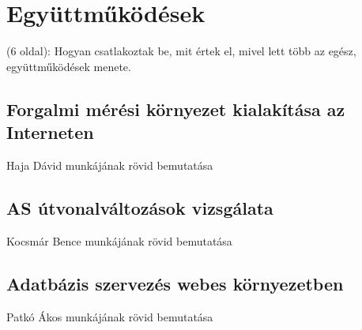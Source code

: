 \chapter{Együttműködések}
(6 oldal): Hogyan csatlakoztak be, mit értek el, mivel lett több az egész, együttműködések menete.

\section{Forgalmi mérési környezet kialakítása az Interneten}
Haja Dávid munkájának rövid bemutatása

\section{AS útvonalváltozások vizsgálata}
Kocsmár Bence munkájának rövid bemutatása

\section{Adatbázis szervezés webes környezetben}
Patkó Ákos munkájának rövid bemutatása